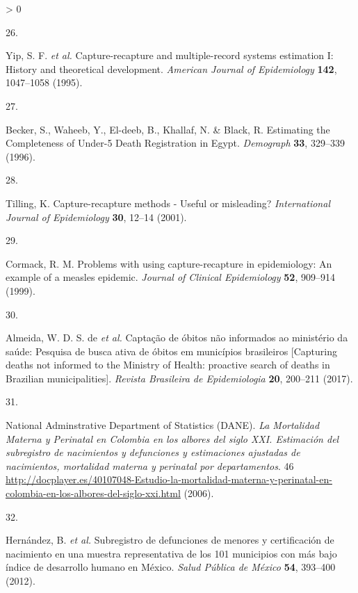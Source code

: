 \documentclass[
]{article}
\newlength{\cslhangindent}
\newlength{\csllabelwidth}
\newenvironment{CSLReferences}[2] %
 {%
  \setlength{\parindent}{0pt}
  \ifodd #1 \everypar{\setlength{\hangindent}{\cslhangindent}}\ignorespaces\fi
  \ifnum #2 > 0
  \setlength{\parskip}{#2\baselineskip}
  \fi
 }%
 {}
\newcommand{\CSLLeftMargin}[1]{\parbox[t]{\csllabelwidth}{#1}}
\newcommand{\CSLRightInline}[1]{\parbox[t]{\linewidth - \csllabelwidth}{#1}\break}
\begin{document}
\begin{CSLReferences}{0}{0}
\leavevmode\hypertarget{ref-Yip1995}{}%
\CSLLeftMargin{26. }
\CSLRightInline{Yip, S. F. \emph{et al.} {Capture-recapture and multiple-record systems estimation I: History and theoretical development}. \emph{American Journal of Epidemiology} \textbf{142}, 1047--1058 (1995).}

\leavevmode\hypertarget{ref-Becker1996}{}%
\CSLLeftMargin{27. }
\CSLRightInline{Becker, S., Waheeb, Y., El-deeb, B., Khallaf, N. \& Black, R. {Estimating the Completeness of Under-5 Death Registration in Egypt}. \emph{Demograph} \textbf{33}, 329--339 (1996).}

\leavevmode\hypertarget{ref-Tilling2001}{}%
\CSLLeftMargin{28. }
\CSLRightInline{Tilling, K. {Capture-recapture methods - Useful or misleading?} \emph{International Journal of Epidemiology} \textbf{30}, 12--14 (2001).}

\leavevmode\hypertarget{ref-Cormack1999}{}%
\CSLLeftMargin{29. }
\CSLRightInline{Cormack, R. M. {Problems with using capture-recapture in epidemiology: An example of a measles epidemic}. \emph{Journal of Clinical Epidemiology} \textbf{52}, 909--914 (1999).}

\leavevmode\hypertarget{ref-DeAlmeida2017a}{}%
\CSLLeftMargin{30. }
\CSLRightInline{Almeida, W. D. S. de \emph{et al.} {Capta{ç}{ã}o de {ó}bitos n{ã}o informados ao minist{é}rio da sa{ú}de: Pesquisa de busca ativa de {ó}bitos em munic{í}pios brasileiros {[}Capturing deaths not informed to the Ministry of Health: proactive search of deaths in Brazilian municipalities{]}}. \emph{Revista Brasileira de Epidemiologia} \textbf{20}, 200--211 (2017).}

\leavevmode\hypertarget{ref-NationalAdminstrativeDepartmentofStatisticsDANE2006}{}%
\CSLLeftMargin{31. }
\CSLRightInline{National Adminstrative Department of Statistics (DANE). \emph{{La Mortalidad Materna y Perinatal en Colombia en los albores del siglo XXI. Estimaci{ó}n del subregistro de nacimientos y defunciones y estimaciones ajustadas de nacimientos, mortalidad materna y perinatal por departamentos}}. 46 \url{http://docplayer.es/40107048-Estudio-la-mortalidad-materna-y-perinatal-en-colombia-en-los-albores-del-siglo-xxi.html} (2006).}

\leavevmode\hypertarget{ref-Hernandez2012}{}%
\CSLLeftMargin{32. }
\CSLRightInline{Hernández, B. \emph{et al.} {Subregistro de defunciones de menores y certificaci{ó}n de nacimiento en una muestra representativa de los 101 municipios con m{á}s bajo {í}ndice de desarrollo humano en M{é}xico}. \emph{Salud P{ú}blica de M{é}xico} \textbf{54}, 393--400 (2012).}


\end{CSLReferences}
\end{document}
